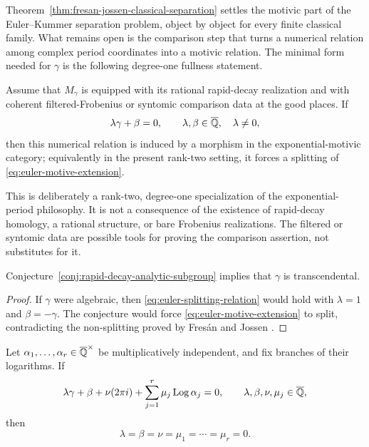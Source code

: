 Theorem~\ref{thm:fresan-jossen-classical-separation} settles the motivic
part of the Euler--Kummer separation problem, object by object for every
finite classical family.  What remains open is the comparison step that
turns a numerical relation among complex period coordinates into a motivic
relation.  The minimal form needed for $\gamma$ is the following degree-one
fullness statement.

\begin{conjecture}
\label{conj:rapid-decay-analytic-subgroup}
Assume that $M_\gamma$ is equipped with its rational rapid-decay realization
and with coherent filtered-Frobenius or syntomic comparison data at the good
places.  If
\begin{equation}\label{eq:euler-splitting-relation}
 \lambda\gamma+\beta=0,
 \qquad \lambda,\beta\in\overline{\mathbb Q},\quad \lambda\ne0,
\end{equation}
then this numerical relation is induced by a morphism in the
exponential-motivic category; equivalently in the present rank-two setting,
it forces a splitting of \eqref{eq:euler-motive-extension}.
\end{conjecture}

This is deliberately a rank-two, degree-one specialization of the
exponential-period philosophy.  It is not a consequence of the existence
of rapid-decay homology, a rational structure, or bare Frobenius
realizations.  The filtered or syntomic data are possible tools for proving
the comparison assertion, not substitutes for it.

\begin{proposition}
\label{prop:rapid-decay-implies-gamma}
Conjecture~\ref{conj:rapid-decay-analytic-subgroup} implies that $\gamma$ is
transcendental.
\end{proposition}

\begin{proof}
If $\gamma$ were algebraic, then
\eqref{eq:euler-splitting-relation} would hold with $\lambda=1$ and
$\beta=-\gamma$.  The conjecture would force
\eqref{eq:euler-motive-extension} to split, contradicting the non-splitting
proved by Fres\'an and Jossen
\cite[Prop.~12.8.7]{FresanJossen}.
\end{proof}

\begin{conjecture}
\label{conj:euler-baker}
Let $\alpha_1,\ldots,\alpha_r\in\overline{\mathbb Q}^\times$ be multiplicatively
independent, and fix branches of their logarithms.  If
\begin{equation}\label{eq:euler-baker-relation}
 \lambda\gamma+\beta+\nu(2\pi i)
 +\sum_{j=1}^r\mu_j\operatorname{Log}\alpha_j=0,
 \qquad
 \lambda,\beta,\nu,\mu_j\in\overline{\mathbb Q},
\end{equation}
then
\[
 \lambda=\beta=\nu=\mu_1=\cdots=\mu_r=0.
\]
\end{conjecture}


